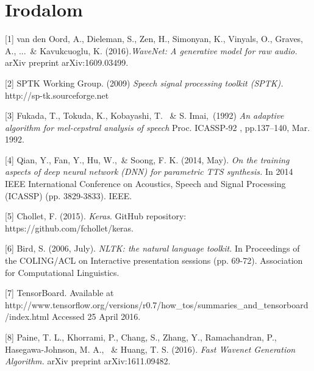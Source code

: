 \section*{Irodalom}



\small


\label{ref_1}[1] van den Oord, A., Dieleman, S., Zen, H., Simonyan, K., Vinyals, O., Graves, A., ...\ \& Kavukcuoglu, K. (2016).{\it WaveNet: A generative model for raw audio.} arXiv preprint arXiv:1609.03499.

\label{ref_2}[2] SPTK Working Group. (2009) {\it Speech signal processing toolkit (SPTK).} http://sp-tk.sourceforge.net

\label{ref_3}[3] Fukada, T., Tokuda, K., Kobayashi, T. \ \& S. Imai,\ (1992) {\it An adaptive algorithm for mel-cepstral 
analysis of speech} Proc. ICASSP-92 , pp.137–140, Mar. 1992.

\label{ref_4}[4] Qian, Y., Fan, Y., Hu, W.,\ \& Soong, F. K. (2014, May). {\it On the training aspects of deep neural network (DNN) for parametric TTS synthesis.} In 2014 IEEE International Conference on Acoustics, Speech and Signal Processing (ICASSP) (pp. 3829-3833). IEEE.

\label{ref_5}[5] Chollet, F. (2015). {\it Keras}. GitHub repository: https://github.com/fchollet/keras.

\label{ref_6}[6] Bird, S. (2006, July). {\it NLTK: the natural language toolkit.} In Proceedings of the COLING/ACL on Interactive presentation sessions (pp. 69-72). Association for Computational Linguistics.

\label{ref_7}[7] TensorBoard. Available at \\ http://www.tensorflow.org/versions/r0.7/how\_tos/summaries\_and\_tensorboard/index.html Accessed 25 April 2016.

\label{ref_8}[8] Paine, T. L., Khorrami, P., Chang, S., Zhang, Y., Ramachandran, P., Hasegawa-Johnson, M. A., \ \& Huang, T. S. (2016). {\it Fast Wavenet Generation Algorithm.} arXiv preprint arXiv:1611.09482.
